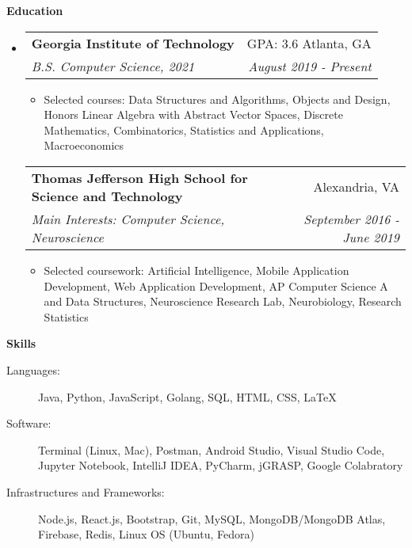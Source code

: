 \documentclass[letterpaper,10pt]{article}
\makeatletter
\newcommand{\resitem}[1]{\item #1 \vspace{-3.5pt}}
\newcommand{\resheading}[1]{{\large \colorbox{mygrey}{\begin{minipage}{\textwidth}{\textbf{#1 \vphantom{p\^{E}}}}\end{minipage}}}}
\newcommand{\ressubheading}[4]{
\begin{tabular*}{7.0in}{l@{\extracolsep{\fill}}r}
		\textbf{#1} & #2 \\
		\textit{#3} & \textit{#4} \\
\end{tabular*}\vspace{-6pt}}
\makeatother
\begin{document}
\resheading{Education}
\begin{itemize}
\item[]  %
    \ressubheading{Georgia Institute of Technology}{GPA: 3.6 \hspace{1em} Atlanta, GA}{B.S. Computer Science, 2021}{August 2019 - Present}
	\begin{itemize}
	    \resitem{Selected courses: Data Structures and Algorithms, Objects and Design, Honors Linear Algebra with Abstract Vector Spaces, Discrete Mathematics, Combinatorics, Statistics and Applications, Macroeconomics}
	\end{itemize}
	\ressubheading{Thomas Jefferson High School for Science and Technology}{Alexandria, VA}{Main Interests: Computer Science, Neuroscience}{September 2016 - June 2019}
	\begin{itemize}
        \resitem{Selected coursework: Artificial Intelligence, Mobile Application Development, Web Application Development, AP Computer Science A and Data Structures, Neuroscience Research Lab, Neurobiology, Research Statistics}
	\end{itemize}
\end{itemize}

\resheading{Skills}

\begin{description}
\item[Languages:] Java, Python, JavaScript, Golang, SQL, HTML, CSS, LaTeX %
\item[Software:] Terminal (Linux, Mac), Postman, Android Studio, Visual Studio Code, Jupyter Notebook, IntelliJ IDEA, PyCharm, jGRASP, Google Colabratory
\item[Infrastructures and Frameworks:] Node.js, React.js, Bootstrap, Git, MySQL, MongoDB/MongoDB Atlas, Firebase, Redis, Linux OS (Ubuntu, Fedora)
\end{description}
\end{document}
